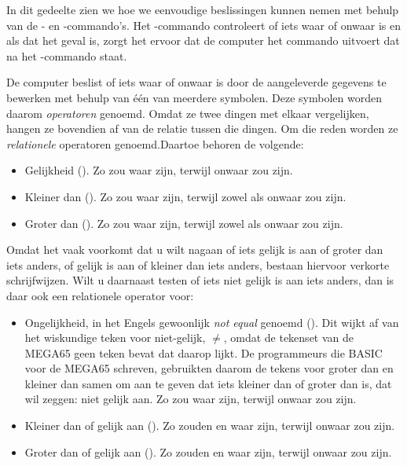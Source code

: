 In dit gedeelte zien we hoe we eenvoudige beslissingen kunnen nemen met behulp van de - en -commando's. Het -commando controleert of iets waar of onwaar is en als dat het geval is, zorgt het ervoor dat de computer het commando uitvoert dat na het -commando staat.

De computer beslist of iets waar of onwaar is door de aangeleverde gegevens te bewerken met behulp van één van meerdere symbolen. Deze symbolen worden daarom {\em operatoren} genoemd. Omdat ze twee dingen met elkaar vergelijken, hangen ze bovendien af van de relatie tussen die dingen. Om die reden worden ze {\em relationele} operatoren genoemd.Daartoe behoren de volgende:

\begin{itemize}
\item Gelijkheid (\stw{=}). Zo zou  waar zijn, terwijl  onwaar zou zijn.  \item Kleiner dan (\stw{<}). Zo zou  waar zijn, terwijl zowel  als  onwaar zou zijn.  \item Groter dan (\stw{>}). Zo zou  waar zijn, terwijl zowel  als  onwaar zou zijn.
\end{itemize}

Omdat het vaak voorkomt dat u wilt nagaan of iets gelijk is aan of groter dan iets anders, of gelijk is aan of kleiner dan iets anders, bestaan hiervoor verkorte schrijfwijzen. Wilt u daarnaast testen of iets niet gelijk is aan iets anders, dan is daar ook een relationele operator voor:

\begin{itemize}
\item Ongelijkheid, in het Engels gewoonlijk {\em not equal} genoemd (\stw{<>}). Dit wijkt af van het wiskundige teken voor niet-gelijk, $\ne$, omdat de tekenset van de MEGA65 geen teken bevat dat daarop lijkt. De programmeurs die BASIC voor de MEGA65 schreven, gebruikten daarom de tekens voor groter dan en kleiner dan samen om aan te geven dat iets kleiner dan of groter dan is, dat wil zeggen: niet gelijk aan. Zo zou  waar zijn, terwijl  onwaar zou zijn.  \item Kleiner dan of gelijk aan (\stw{<=}). Zo zouden  en  waar zijn, terwijl  onwaar zou zijn.  \item Groter dan of gelijk aan (\stw{>=}). Zo zouden  en  waar zijn, terwijl  onwaar zou zijn.
\end{itemize}

